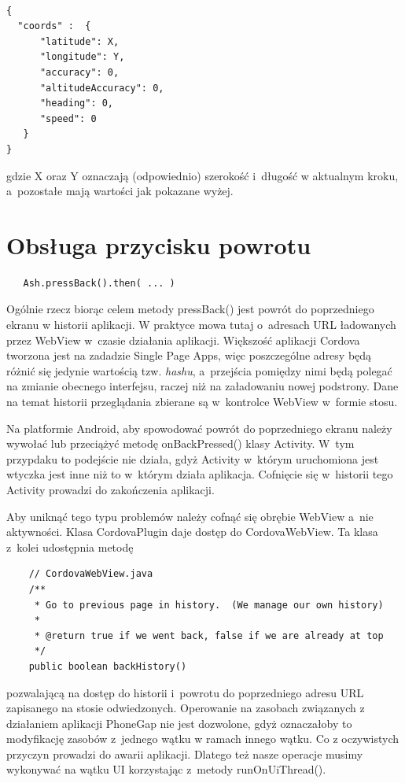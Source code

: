 \documentclass[brudnopis]{xmgr}
\begin{document}
\begin{lstlisting}

{
  "coords" :  {
      "latitude": X, 
      "longitude": Y,
      "accuracy": 0, 
      "altitudeAccuracy": 0, 
      "heading": 0, 
      "speed": 0
   }
}

\end{lstlisting}

gdzie X oraz Y oznaczają (odpowiednio) szerokość i~długość w aktualnym kroku, a~pozostałe mają wartości jak pokazane wyżej.   

\section{Obsługa przycisku powrotu}

\begin{lstlisting}
   Ash.pressBack().then( ... ) 
\end{lstlisting}

Ogólnie rzecz biorąc celem metody pressBack() jest powrót do poprzedniego ekranu w historii aplikacji. W praktyce mowa tutaj o~adresach URL ładowanych przez WebView w~czasie działania aplikacji. Większość aplikacji Cordova tworzona jest na zadadzie Single Page Apps, więc poszczególne adresy będą różnić się jedynie wartością tzw. \textit{hashu}, a~przejścia pomiędzy nimi będą polegać na zmianie obecnego interfejsu, raczej niż na załadowaniu nowej podstrony. Dane na temat historii przeglądania zbierane są w~kontrolce WebView w~formie stosu.

Na platformie Android, aby spowodować powrót do poprzedniego ekranu należy wywołać lub przeciążyć metodę onBackPressed() klasy Activity. W~tym przypdaku to podejście nie działa, gdyż Activity w~którym uruchomiona jest wtyczka jest inne niż to w~którym działa aplikacja. Cofnięcie się w~historii tego Activity prowadzi do zakończenia aplikacji. 

Aby uniknąć tego typu problemów należy cofnąć się obrębie WebView a~nie aktywności. Klasa CordovaPlugin daje dostęp do CordovaWebView. Ta klasa z~kolei udostępnia metodę 

\begin{lstlisting}
    // CordovaWebView.java
    /**
     * Go to previous page in history.  (We manage our own history)
     *
     * @return true if we went back, false if we are already at top
     */
    public boolean backHistory()
\end{lstlisting}

pozwalającą na dostęp do historii i~powrotu do poprzedniego  adresu URL zapisanego na stosie odwiedzonych. Operowanie na zasobach związanych z działaniem aplikacji PhoneGap nie jest dozwolone, gdyż oznaczałoby to modyfikację zasobów z~jednego wątku w ramach innego wątku. Co z oczywistych przyczyn prowadzi do awarii aplikacji. Dlatego też nasze operacje musimy wykonywać na wątku UI korzystając z~metody runOnUiThread().
\end{document}
